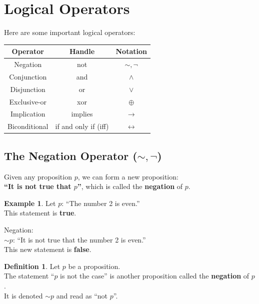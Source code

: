 \documentclass[
]{book}
\theoremstyle{definition}
\newtheorem{definition}{Definition}[chapter]
\theoremstyle{definition}
\newtheorem{example}{Example}[chapter]
\theoremstyle{definition}
\theoremstyle{definition}
\theoremstyle{remark}
\begin{document}
\section{Logical Operators}\label{logical-operators}

Here are some important logical operators:

\begin{longtable}[]{@{}ccc@{}}
\toprule\noalign{}
\textbf{Operator} & \textbf{Handle} & \textbf{Notation} \\
\midrule\noalign{}
\endhead
\bottomrule\noalign{}
\endlastfoot
Negation & not & \(\sim ,\neg\) \\
Conjunction & and & \(\land\) \\
Disjunction & or & \(\lor\) \\
Exclusive-or & xor & \(\oplus\) \\
Implication & implies & \(\rightarrow\) \\
Biconditional & if and only if (iff) & \(\leftrightarrow\) \\
\end{longtable}

\subsection{\texorpdfstring{The Negation Operator (\(\sim,\neg\))}{The Negation Operator (\textbackslash sim,\textbackslash neg)}}\label{the-negation-operator-simneg}

Given any proposition \(p\), we can form a new proposition:\\
\textbf{``It is not true that \(p\)''}, which is called the \textbf{negation} of \(p\).

\begin{example}
\protect\hypertarget{exm:unnamed-chunk-12}{}\label{exm:unnamed-chunk-12}Let \(p\): ``The number 2 is even.''\\
This statement is \textbf{true}.

Negation:\\
\(\sim p\): ``It is not true that the number 2 is even.''\\
This new statement is \textbf{false}.
\end{example}

\begin{definition}
\protect\hypertarget{def:unnamed-chunk-13}{}\label{def:unnamed-chunk-13}Let \(p\) be a proposition.\\
The statement ``\(p\) is not the case'' is another proposition called the \textbf{negation} of \(p\).\\
It is denoted \(\sim p\) and read as ``not \(p\)''.
\end{definition}
\end{document}
